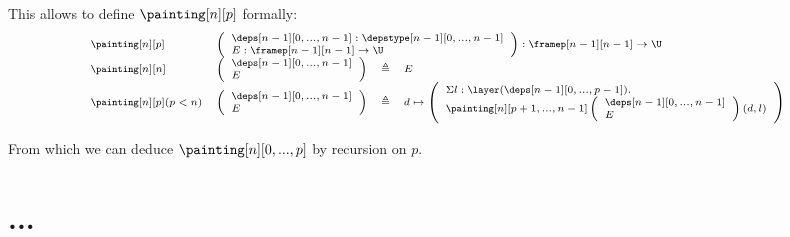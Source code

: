 \documentclass{msc}
\newcommand{\defeq}{\ensuremath{\triangleq}}
\begin{document}
This allows to define $\painting[n][p]$ formally:
\begin{equation*}
  \fontsize{7.2}{9}\selectfont
  \begin{array}{llcl}
    \painting[n][p]          &
    \multicolumn{3}{l}{
      \left(\begin{array}{l}
                \deps[n-1][0,...,n-1]:\depstype[n-1][0,...,n-1] \\
                E:\framep[n-1][n-1]\rightarrow \U               \\
              \end{array}\right) : \framep[n-1][n-1]\rightarrow \U
    }                                                            \\
    \painting[n][n]          &
    \left(\begin{array}{l}
              \deps[n-1][0,...,n-1] \\
              E                     \\
            \end{array}\right) & \defeq & E                        \\
    \painting[n][p](p<n)     &
    \left(\begin{array}{l}
              \deps[n-1][0,...,n-1] \\
              E                     \\
            \end{array}\right) & \defeq & d \mapsto
    \left(\begin{array}{l}
              \Sigma l:\layer(\deps[n-1][0,...,p-1]). \\
              \painting[n][p+1,...,n-1]
              \left(\begin{array}{l}
                  \deps[n-1][0,...,n-1] \\
                  E                     \\
                \end{array}\right)(d,l)           \\
            \end{array}\right) \\
  \end{array}
\end{equation*}

From which we can deduce $\painting[n][0,...,p]$ by recursion on $p$.

\section{...}
\end{document}
